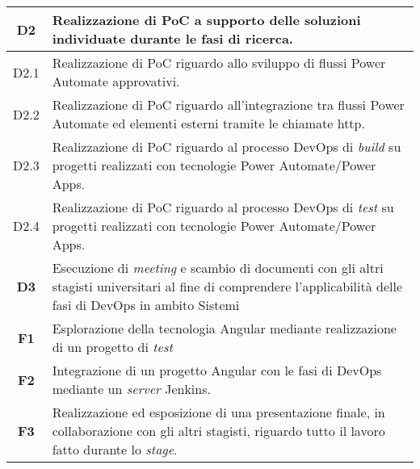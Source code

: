 \begin{longtable}{|c|p{11cm}|}
\hline \textbf{D2}  & Realizzazione di PoC a supporto delle soluzioni individuate durante le fasi di ricerca.\\
\hline D2.1  & Realizzazione di PoC riguardo allo sviluppo di flussi Power Automate approvativi.\\
\hline D2.2  & Realizzazione di PoC riguardo all'integrazione tra flussi Power Automate ed elementi esterni tramite le chiamate \gls{http}.\\
\hline D2.3  & Realizzazione di PoC riguardo al processo \gls{DevOps} di \emph{build} su progetti realizzati con tecnologie Power Automate/Power Apps.\\
\hline D2.4  & Realizzazione di PoC riguardo al processo \gls{DevOps} di \emph{test} su progetti realizzati con tecnologie Power Automate/Power Apps.\\
\hline \textbf{D3}  & Esecuzione di \emph{meeting} e scambio di documenti con gli altri stagisti universitari al fine di comprendere l'applicabilità delle fasi di \gls{DevOps} in ambito \gls{Sistemi} \\
\hline 
\hline \textbf{F1}  & Esplorazione della tecnologia Angular mediante realizzazione di un progetto di \emph{test}\\
\hline \textbf{F2}  & Integrazione di un progetto Angular con le fasi di \gls{DevOps} mediante un \emph{server} Jenkins.\\
\hline \textbf{F3}  & Realizzazione ed esposizione di una presentazione finale, in collaborazione con gli altri stagisti, riguardo tutto il lavoro fatto durante lo \emph{stage}.\\
\end{longtable}

